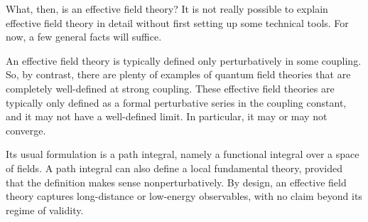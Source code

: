 What, then, is an effective field theory?
It is not really possible to explain effective field theory in detail without
first setting up some technical tools. For now, a few general facts will
suffice.

An effective field theory is typically defined only perturbatively in some
coupling.
So, by contrast, there are plenty of examples of quantum field theories that are
completely well-defined at strong coupling. These effective field theories are
typically only defined as a formal perturbative series in the coupling constant,
and it may not have a well-defined limit. In particular, it may or may not
converge.

Its usual formulation is a path integral, namely a functional integral over a
space of fields.
A path integral can also define a local fundamental theory, provided that the
definition makes sense nonperturbatively.
By design, an effective field theory captures long-distance or low-energy
observables, with no claim beyond its regime of validity.

